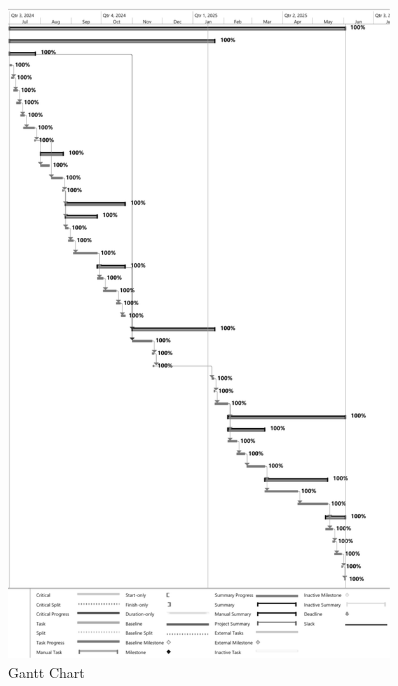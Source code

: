 \begin{figure}[H]  
    \centering
    \includegraphics[width=0.9\textwidth]{Images/Gantt Chart.png}  
    \caption*{Gantt Chart}
    \label{Gantt Chart}  %
\end{figure}

\pagebreak
